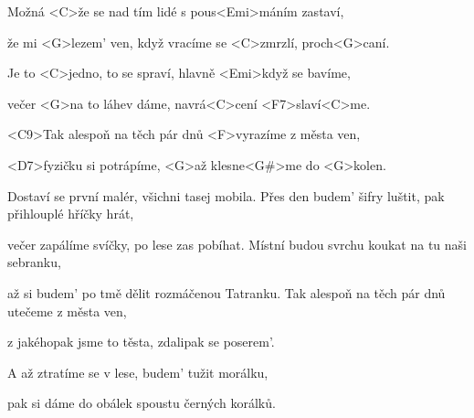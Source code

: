 

\zs

Možná <C>že se nad tím lidé
s pous<Emi>máním zastaví,

že mi <G>lezem' ven, když vracíme se
<C>zmrzlí, proch<G>caní.
\ks

\zs

Je to <C>jedno, to se spraví,
hlavně <Emi>když se bavíme,

večer <G>na to láhev dáme,
navrá<C>cení <F7>slaví<C>me.
\ks

\zr

<C9>Tak alespoň na těch pár dnů
<F>vyrazíme z města ven,

<D7>fyzičku si potrápíme,
<G>až klesne<G#>me do <G>kolen.
\kr

\zs
{}

Dostaví se první malér,
všichni tasej mobila.
\ks
\zs
Přes den budem' šifry luštit,
pak přihlouplé hříčky hrát,

večer zapálíme svíčky,
po lese zas pobíhat.
\ks
\zs
Místní budou svrchu koukat
na tu naši sebranku,

až si budem' po tmě dělit
rozmáčenou Tatranku.
\ks
\zr
Tak alespoň na těch pár dnů
utečeme z města ven,

z jakéhopak jsme to těsta,
zdalipak se poserem'.
\kr

\zs
A až ztratíme se v lese,
budem' tužit morálku,

pak si dáme do obálek
spoustu černých korálků.
\ks

\kp







